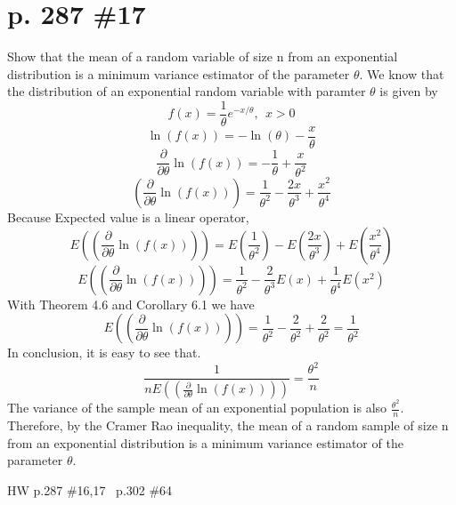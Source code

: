 \documentclass[12pt]{article}
\begin{document}
	\section[20pt]{p. 287 \#17}
	Show that the mean of a random variable of size n from an exponential distribution is a minimum variance estimator of the parameter \(\theta\).
	\newline \newline
	We know that the distribution of an exponential random variable with paramter \(\theta\) is given by
	\[f(x) = \frac{1}{\theta}e^{-x/\theta},\ \ x>0\]
	\[\ln(f(x)) = -\ln(\theta) -\frac{x}{\theta}\]
	\[\frac{\partial}{\partial \theta}\ln(f(x)) = -\frac{1}{\theta} + \frac{x}{\theta^2}\]
	\[\left(\frac{\partial}{\partial \theta}\ln(f(x))\right) = \frac{1}{\theta^2} - \frac{2x}{\theta^3} + \frac{x^2}{\theta^4}\]
	Because Expected value is a linear operator,
	\[E\left(\left(\frac{\partial}{\partial \theta}\ln(f(x))\right)\right) = E(\frac{1}{\theta^2}) - E(\frac{2x}{\theta^3}) + E(\frac{x^2}{\theta^4})\]
	\[E\left(\left(\frac{\partial}{\partial \theta}\ln(f(x))\right)\right)=\frac{1}{\theta^2}-\frac{2}{\theta^3}E(x)+\frac{1}{\theta^4}E(x^2)\]
	With Theorem 4.6 and Corollary 6.1 we have
	\[E\left(\left(\frac{\partial}{\partial \theta}\ln(f(x))\right)\right)=\frac{1}{\theta^2}-\frac{2}{\theta^2}+\frac{2}{\theta^2} = \frac{1}{\theta^2}\]
	In conclusion, it is easy to see that.
	\[\frac{1}{nE\left(\left(\frac{\partial}{\partial \theta}\ln(f(x))\right)\right)} = \frac{\theta^2}{n}\]
	The variance of the sample mean of an exponential population is also \(\frac{\theta^2}{n}\). \newline \newline
	Therefore, by the Cramer Rao inequality, the mean of a random sample of size n from an exponential distribution is a minimum variance estimator of the parameter \(\theta\).
	\newpage
	\maketitle HW p.287 \#16,17 \ p.302 \#64
\end{document}
